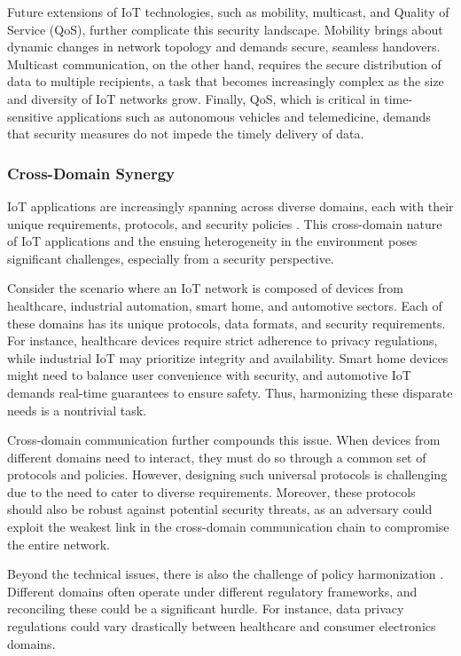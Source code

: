 \documentclass{ieeeaccess}
\begin{document}
Future extensions of IoT technologies, such as mobility, multicast, and Quality of Service (QoS), further complicate this security landscape. Mobility brings about dynamic changes in network topology and demands secure, seamless handovers. Multicast communication, on the other hand, requires the secure distribution of data to multiple recipients, a task that becomes increasingly complex as the size and diversity of IoT networks grow. Finally, QoS, which is critical in time-sensitive applications such as autonomous vehicles and telemedicine, demands that security measures do not impede the timely delivery of data.

\subsubsection{Cross-Domain Synergy}

IoT applications are increasingly spanning across diverse domains, each with their unique requirements, protocols, and security policies \cite{marinakis2018advanced}. This cross-domain nature of IoT applications and the ensuing heterogeneity in the environment poses significant challenges, especially from a security perspective.

Consider the scenario where an IoT network is composed of devices from healthcare, industrial automation, smart home, and automotive sectors. Each of these domains has its unique protocols, data formats, and security requirements. For instance, healthcare devices require strict adherence to privacy regulations, while industrial IoT may prioritize integrity and availability. Smart home devices might need to balance user convenience with security, and automotive IoT demands real-time guarantees to ensure safety. Thus, harmonizing these disparate needs is a nontrivial task.

Cross-domain communication further compounds this issue. When devices from different domains need to interact, they must do so through a common set of protocols and policies. However, designing such universal protocols is challenging due to the need to cater to diverse requirements. Moreover, these protocols should also be robust against potential security threats, as an adversary could exploit the weakest link in the cross-domain communication chain to compromise the entire network.

Beyond the technical issues, there is also the challenge of policy harmonization \cite{bringhenti2021toward}. Different domains often operate under different regulatory frameworks, and reconciling these could be a significant hurdle. For instance, data privacy regulations could vary drastically between healthcare and consumer electronics domains.
\end{document}
